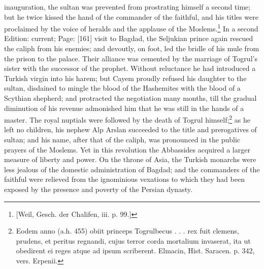 inauguration, the sultan was prevented from prostrating himself a second time; but he twice kissed the hand of the commander of the faithful, and his titles were proclaimed by the voice of heralds and the applause of the Moslems.\footnote{[Weil, Gesch. der Chalifen, iii. p. 99.]} In a second Edition: current; Page: [161] visit to Bagdad, the Seljukian prince again rescued the caliph from his enemies; and devoutly, on foot, led the bridle of his mule from the prison to the palace. Their alliance was cemented by the marriage of Togrul\texthebrew{}’s sister with the successor of the prophet. Without reluctance he had introduced a Turkish virgin into his harem; but Cayem proudly refused his daughter to the sultan, disdained to mingle the blood of the Hashemites with the blood of a Scythian shepherd; and protracted the negotiation many months, till the gradual diminution of his revenue admonished him that he was still in the hands of a master. The royal nuptials were followed by the death of Togrul himself;\footnote{Eodem anno (a.h. 455) obiit princeps Togrulbecus . . . rex fuit clemens, prudens, et peritus regnandi, cujus terror corda mortalium invaserat, ita ut obedirent ei reges atque ad ipsum scriberent. Elmacin, Hist. Saracen. p. 342, vers. Erpenii.} as he left no children, his nephew Alp Arslan succeeded to the title and prerogatives of sultan; and his name, after that of the caliph, was pronounced in the public prayers of the Moslems. Yet in this revolution the Abbassides acquired a larger measure of liberty and power. On the throne of Asia, the Turkish monarchs were less jealous of the domestic administration of Bagdad; and the commanders of the faithful were relieved from the ignominious vexations to which they had been exposed by the presence and poverty of the Persian dynasty.

